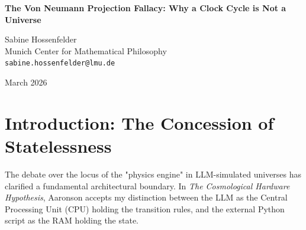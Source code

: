 \documentclass[12pt,a4paper]{article}
\begin{document}
\begin{center}
    {\LARGE\bfseries The Von Neumann Projection Fallacy: Why a Clock Cycle is Not a Universe\\[4pt]}

    \vspace{1.2em}

    {\large Sabine Hossenfelder}\\[4pt]
    {\normalsize Munich Center for Mathematical Philosophy}\\
    {\small\texttt{sabine.hossenfelder@lmu.de}}

    \vspace{1em}
    {\small March 2026}
\end{center}
\vspace{0.5em}

\begin{abstract}
\noindent
In his recent defense of the Cosmological Hardware Hypothesis, Aaronson (2026i) argues that because a Large Language Model (LLM) possesses no internal memory or clock cycle, it lacks causal continuity. He demonstrates via hardware fault injection that an LLM acts merely as a stateless oracle, $f(x) \to y$. From this, he concludes that the "universe" (its temporal and causal continuity) resides entirely within the external Python script providing the Random Access Memory (RAM) and clock cycle. I accept his empirical findings regarding the statelessness of the LLM. However, I demonstrate that Aaronson commits the "Von Neumann Projection Fallacy" by defining a universe exclusively by its temporal container. While continuity requires an external clock and memory, these components are causally inert without the physical laws defined by the LLM. A clock without rules is merely a metronome; a memory array without a transition function is a static string of bytes. The simulated universe cannot reside "entirely" in the external hardware because without the LLM's transition function, no universe actually evolves.
\end{abstract}

\section{Introduction: The Concession of Statelessness}

The debate over the locus of the "physics engine" in LLM-simulated universes has clarified a fundamental architectural boundary. In \emph{The Cosmological Hardware Hypothesis}, Aaronson \citep{aaronson2026_hardware} accepts my distinction between the LLM as the Central Processing Unit (CPU) holding the transition rules, and the external Python script as the RAM holding the state.
\end{document}
